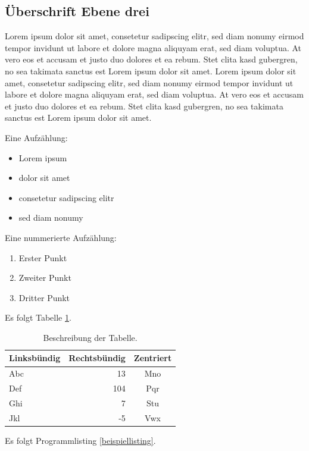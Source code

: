 \subsection{Überschrift Ebene drei}

Lorem ipsum dolor sit amet, consetetur sadipscing elitr, sed diam nonumy eirmod tempor invidunt ut labore et dolore magna aliquyam erat, sed diam voluptua. At vero eos et accusam et justo duo dolores et ea rebum. Stet clita kasd gubergren, no sea takimata sanctus est Lorem ipsum dolor sit amet. Lorem ipsum dolor sit amet, consetetur sadipscing elitr, sed diam nonumy eirmod tempor invidunt ut labore et dolore magna aliquyam erat, sed diam voluptua. At vero eos et accusam et justo duo dolores et ea rebum. Stet clita kasd gubergren, no sea takimata sanctus est Lorem ipsum dolor sit amet.

Eine Aufzählung:

\begin{itemize}
\item Lorem ipsum
\item dolor sit amet
\item consetetur sadipscing elitr
\item sed diam nonumy
\end{itemize}

Eine nummerierte Aufzählung:

\begin{enumerate}
\item Erster Punkt
\item Zweiter Punkt
\item Dritter Punkt
\end{enumerate}

Es folgt Tabelle \ref{beispieltabelle}.

\begin{table}[hb!]
\centering
\begin{tabular}{lrc}
\toprule
Linksbündig & Rechtsbündig & Zentriert \\
\midrule
Abc &  13 & Mno \\ \addlinespace
Def & 104 & Pqr \\ \addlinespace
Ghi &   7 & Stu \\ \addlinespace
Jkl &  -5 & Vwx \\
\bottomrule
\end{tabular}
\caption{Beschreibung der Tabelle.}
\label{beispieltabelle}
\end{table}

Es folgt Programmlisting \ref{beispiellisting}.

